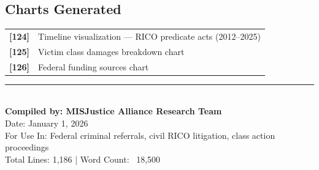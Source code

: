 \documentclass[11pt,letterpaper]{article}
\begin{document}
\subsection{Charts Generated}

\begin{tabular}{lp{4.5in}}
\textbf{[124]} & Timeline visualization --- RICO predicate acts (2012--2025)\\
\textbf{[125]} & Victim class damages breakdown chart\\
\textbf{[126]} & Federal funding sources chart\\
\end{tabular}

\vspace{0.5in}

\begin{center}
\textcolor{Gold}{\rule{3in}{1.5pt}}\\[20pt]
{\large\bfseries Compiled by: MISJustice Alliance Research Team}\\[8pt]
{\large Date: January 1, 2026}\\[8pt]
{\large For Use In: Federal criminal referrals, civil RICO litigation, class action proceedings}\\[16pt]
{\normalsize Total Lines: 1,186 | Word Count: ~18,500}
\end{center}
\end{document}

